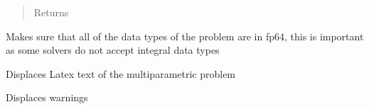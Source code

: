 \documentclass[letterpaper,10pt,english]{sphinxmanual}
\begin{document}
\begin{fulllineitems}
\begin{fulllineitems}
\begin{quote}
\begin{description}
\item[{Returns}] \leavevmode
\sphinxAtStartPar


\end{description}\end{quote}

\end{fulllineitems}


\begin{fulllineitems}
\label{\detokenize{ppopt:ppopt.mplp_program.MPLP_Program.constraint_datatype_conversion}}
\sphinxAtStartPar
Makes sure that all of the data types of the problem are in fp64, this is important as some solvers do not accept integral data types

\end{fulllineitems}


\begin{fulllineitems}
\label{\detokenize{ppopt:ppopt.mplp_program.MPLP_Program.display_latex}}
\sphinxAtStartPar
Displaces Latex text of the multiparametric problem

\end{fulllineitems}


\begin{fulllineitems}
\label{\detokenize{ppopt:ppopt.mplp_program.MPLP_Program.display_warnings}}
\sphinxAtStartPar
Displaces warnings

\end{fulllineitems}



\end{fulllineitems}
\end{document}
